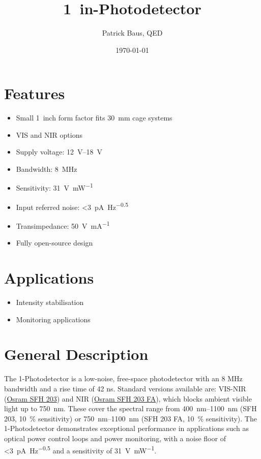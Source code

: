 \documentclass[fontsize=10pt]{datasheet}
\title{\qty{1}{in}-Photodetector}
\author{Patrick Baus, QED}
\date{\today}
\begin{document}
\maketitle

\section*{Features}

\begin{itemize}
\item{Small \qty{1}{inch} form factor fits \qty{30}{\mm} cage systems}
\item{VIS and NIR options}
\item{Supply voltage: \qtyrange{12}{18}{\V}}
\item{Bandwidth: \qty{8}{\MHz}}
\item{Sensitivity: \qty{31}{\V \per \mW}}
\item{Input referred noise: \qty{<3}{\pA \per \Hz\tothe{0.5}}}
\item{Transimpedance: \qty{50}{\V \per \mA}}
\item{Fully open-source design}
\end{itemize}

\section*{Applications}

\begin{itemize}
\item{Intensity stabilisation}
\item{Monitoring applications}
\end{itemize}

\section*{General Description}
The \qty{1}{\inch}-Photodetector is a low-noise, free-space photodetector with an 8 MHz bandwidth and a rise time of 42 ns. Standard versions available are: VIS-NIR (\href{https://ams-osram.com/products/photodetectors/photodiodes/osram-radial-t1-34-sfh-203}{Osram SFH 203}) and NIR (\href{https://ams-osram.com/products/photodetectors/photodiodes/osram-radial-t1-34-sfh-203-fa}{Osram SFH 203 FA}), which blocks ambient visible light up to \qty{750}{\nm}. These cover the spectral range from \qtyrange{400}{1100}{\nm} (SFH 203, \qty{10}{\percent} sensitivity) or \qtyrange{750}{1100}{\nm}  (SFH 203 FA, \qty{10}{\percent} sensitivity). The \qty{1}{\inch}-Photodetector demonstrates exceptional performance in applications such as optical power control loops and power monitoring, with a noise floor of \qty{<3}{\pA \per \Hz\tothe{0.5}} and a sensitivity of \qty{31}{\V \per \mW}.
\end{document}
